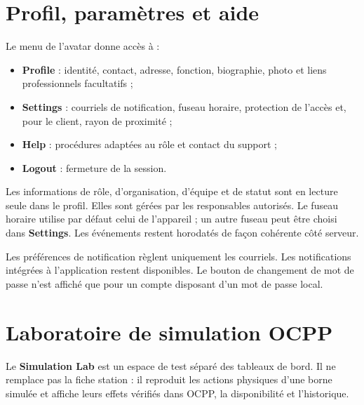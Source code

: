 \section{Profil, paramètres et aide}

Le menu de l'avatar donne accès à :

\begin{itemize}[leftmargin=1.6em]
  \item \textbf{Profile} : identité, contact, adresse, fonction, biographie,
  photo et liens professionnels facultatifs ;
  \item \textbf{Settings} : courriels de notification, fuseau horaire,
  protection de l'accès et, pour le client, rayon de proximité ;
  \item \textbf{Help} : procédures adaptées au rôle et contact du support ;
  \item \textbf{Logout} : fermeture de la session.
\end{itemize}

Les informations de rôle, d'organisation, d'équipe et de statut sont en lecture
seule dans le profil. Elles sont gérées par les responsables autorisés. Le
fuseau horaire utilise par défaut celui de l'appareil ; un autre fuseau peut être
choisi dans \textbf{Settings}. Les événements restent horodatés de façon
cohérente côté serveur.

Les préférences de notification règlent uniquement les courriels. Les
notifications intégrées à l'application restent disponibles. Le bouton de
changement de mot de passe n'est affiché que pour un compte disposant d'un mot
de passe local.

\section{Laboratoire de simulation OCPP}

Le \textbf{Simulation Lab} est un espace de test séparé des tableaux de bord.
Il ne remplace pas la fiche station : il reproduit les actions physiques d'une
borne simulée et affiche leurs effets vérifiés dans OCPP, la disponibilité et
l'historique.


